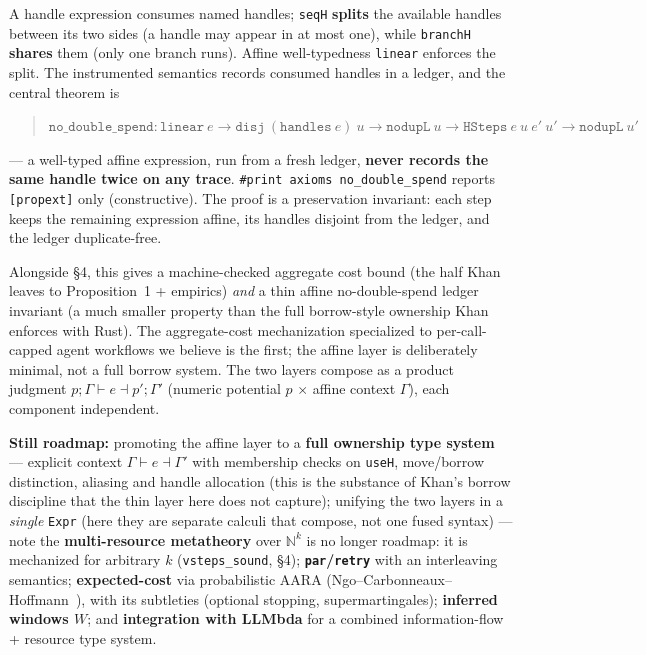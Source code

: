 \documentclass[11pt]{article}
\theoremstyle{plain}
\begin{document}
A handle expression consumes named handles; \texttt{seqH} \textbf{splits} the available handles
between its two sides (a handle may appear in at most one), while \texttt{branchH} \textbf{shares}
them (only one branch runs). Affine well-typedness \texttt{linear} enforces the split. The
instrumented semantics records consumed handles in a ledger, and the central theorem is
\begin{quote}
$\texttt{no\_double\_spend} : \texttt{linear}\ e \to \texttt{disj}\ (\texttt{handles}\ e)\ u \to
\texttt{nodupL}\ u \to \texttt{HSteps}\ e\ u\ e'\ u' \to \texttt{nodupL}\ u'$
\end{quote}
--- a well-typed affine expression, run from a fresh ledger, \textbf{never records the same handle
twice on any trace}. \texttt{\#print axioms no\_double\_spend} reports \texttt{[propext]} only
(constructive). The proof is a preservation invariant: each step keeps the remaining expression
affine, its handles disjoint from the ledger, and the ledger duplicate-free.

Alongside \S4, this gives a machine-checked aggregate cost bound (the half Khan leaves to
Proposition~1 + empirics) \emph{and} a thin affine no-double-spend ledger invariant (a much smaller
property than the full borrow-style ownership Khan enforces with Rust). The aggregate-cost
mechanization specialized to per-call-capped agent workflows we believe is the first; the affine
layer is deliberately minimal, not a full borrow system. The two layers compose as a product
judgment $p; \Gamma \vdash e \dashv p'; \Gamma'$ (numeric potential $p$ $\times$ affine context
$\Gamma$), each component independent.

\textbf{Still roadmap:} promoting the affine layer to a \textbf{full ownership type system} ---
explicit context $\Gamma \vdash e \dashv \Gamma'$ with membership checks on \texttt{useH},
move/borrow distinction, aliasing and handle allocation (this is the substance of Khan's borrow
discipline that the thin layer here does not capture); unifying the two layers in a \emph{single}
\texttt{Expr} (here they are separate calculi that compose, not one fused syntax) --- note the
\textbf{multi-resource metatheory} over $\mathbb{N}^k$ is no longer roadmap: it is mechanized for
arbitrary $k$ (\texttt{vsteps\_sound}, \S4); \textbf{\texttt{par}/\texttt{retry}}
with an interleaving semantics; \textbf{expected-cost} via probabilistic AARA
(Ngo--Carbonneaux--Hoffmann~\cite{ngo2018}), with its subtleties (optional stopping,
supermartingales); \textbf{inferred windows $W$}; and \textbf{integration with LLMbda} for a
combined information-flow + resource type system.
\end{document}
